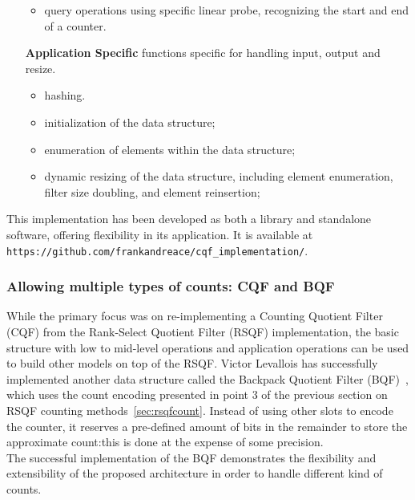 \begin{itemize}[leftmargin=1.8cm]
\begin{itemize}
		\item query operations using specific linear probe, recognizing the start and end of a counter.
	\end{itemize}
	\item[\textbf{Application Specific}] functions specific for handling input, output and resize.
	\begin{itemize}
		\item \kmer hashing.
		\item initialization of the data structure;
		\item enumeration of elements within the data structure;
		\item dynamic resizing of the data structure, including element enumeration, filter size doubling, and element reinsertion;
	\end{itemize} 
\end{itemize}
This implementation has been developed as both a library and standalone software, offering flexibility in its application. It is available at \texttt{https://github.com/frankandreace/cqf\_implementation/}.
\subsubsection{Allowing multiple types of counts: CQF and BQF}
While the primary focus was on re-implementing a Counting Quotient Filter (CQF) from the Rank-Select Quotient Filter (RSQF) implementation, the basic structure with low to mid-level operations and application operations can be used to build other models on top of the RSQF. Victor Levallois has successfully implemented another data structure called the Backpack Quotient Filter (\gls{BQF})~\cite{bqf}, which uses the count encoding presented in point 3 of the previous section on RSQF counting methods~\ref{sec:rsqfcount}. Instead of using other slots to encode the counter, it reserves a pre-defined amount of bits in the remainder to store the approximate count:this is done at the expense of some precision.\\
The successful implementation of the BQF demonstrates the flexibility and extensibility of the proposed architecture in order to handle different kind of counts.

